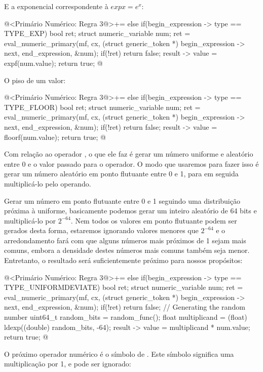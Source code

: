 E a exponencial correspondente à $exp x = e^x$:

\iniciocodigo
@<Primário Numérico: Regra 3@>+=
else if(begin_expression -> type == TYPE_EXP){
  bool ret;
  struct numeric_variable num;
  ret = eval_numeric_primary(mf, cx, (struct generic_token *)
                             begin_expression -> next,
                             end_expression, &num);
  if(!ret)
    return false;
  result -> value = expf(num.value);
  return true;
}
@
\fimcodigo

O piso de um valor:

\iniciocodigo
@<Primário Numérico: Regra 3@>+=
else if(begin_expression -> type == TYPE_FLOOR){
  bool ret;
  struct numeric_variable num;
  ret = eval_numeric_primary(mf, cx, (struct generic_token *)
                             begin_expression -> next,
                             end_expression, &num);
  if(!ret)
    return false;
  result -> value = floorf(num.value);
  return true;
}
@
\fimcodigo

Com relação ao operador , o que ele faz é
gerar um número uniforme e aleatório entre 0 e o valor passado para o
operador. O modo que usaremos para fazer isso é gerar um número
aleatório em ponto flutuante entre 0 e 1, para em seguida
multiplicá-lo pelo operando.

Gerar um número em ponto flutuante entre 0 e 1 seguindo uma
distribuição próxima à uniforme, basicamente podemos gerar um inteiro
aleatório de 64 bits e multiplicá-lo por $2^{-64}$. Nem todos os valores
em ponto flutuante podem ser gerados desta forma, estaremos ignorando
valores menores que $2^{-64}$ e o arredondamento fará com que alguns
números mais próximos de 1 sejam mais comuns, embora a densidade
destes números mais comuns também seja menor. Entretanto, o resultado
será suficientemente próximo para nossos propósitos:

\iniciocodigo
@<Primário Numérico: Regra 3@>+=
else if(begin_expression -> type == TYPE_UNIFORMDEVIATE){
  bool ret;
  struct numeric_variable num;
  ret = eval_numeric_primary(mf, cx, (struct generic_token *)
                             begin_expression -> next,
                             end_expression, &num);
  if(!ret)
    return false;
  { // Generating the random number
    uint64_t random_bits = random_func();
    float multiplicand = (float) ldexp((double) random_bits, -64);
    result -> value = multiplicand * num.value;
  }
  return true;
}
@
\fimcodigo

O próximo operador numérico é o símbolo de \monoespaco{+}. Este
símbolo significa uma multiplicação por 1, e pode ser ignorado:


